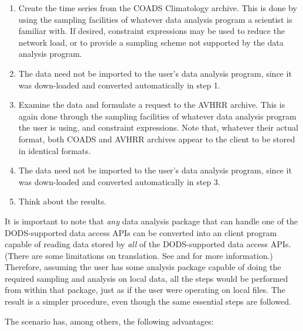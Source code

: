 \begin{enumerate}

\item Create the time series from the COADS Climatology archive. This is
done by using the sampling facilities of whatever data analysis program
a scientist is familiar with.  If desired, \opendap constraint expressions
may be used to reduce the network load, or to provide a sampling scheme
not supported by the data analysis program.

\item The data need not be imported to the user's data analysis program,
since it was down-loaded and converted automatically in step 1.

\item Examine the data and formulate a request to the AVHRR archive. This
is again done through the sampling facilities of whatever data analysis
program the user is using, and \opendap constraint expressions.  Note that,
whatever their actual format, both COADS and AVHRR archives appear to the
\opendap client to be stored in identical formats.

\item The data need not be imported to the user's data analysis program,
since it was down-loaded and converted automatically in step 3.

\item Think about the results.

\end{enumerate}

It is important to note that {\em any} data analysis package that can
handle one of the DODS-supported data access APIs can be converted
into an \opendap client program capable of reading data stored by {\em all}
of the DODS-supported data access APIs. (There are some limitations on
translation. See  and
 for more information.) Therefore, assuming
the user has some analysis package capable of doing the required
sampling and analysis on local data, all the steps would be performed
from within that package, just as if the user were operating on local
files. The result is a simpler procedure, even though the same 
essential steps are followed.

The \opendap scenario has, among others, the following advantages:

